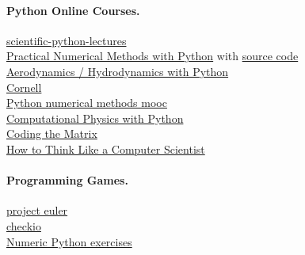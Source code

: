 \documentclass[%
oneside,                 %
final,                   %
10pt]{article}
\begin{document}
\paragraph{Python Online Courses.}
\href{{https://github.com/jrjohansson/scientific-python-lectures}}{scientific-python-lectures}  \\
\href{{http://openedx.seas.gwu.edu/courses/GW/MAE6286/2014_fall/about}}{Practical Numerical Methods with Python} with \href{{https://github.com/numerical-mooc/numerical-mooc}}{source code} \\
\href{{http://openedx.seas.gwu.edu/courses/GW/MAE6226/2014_spring/about}}{Aerodynamics / Hydrodynamics with Python} \\
\href{{http://pages.physics.cornell.edu/~sethna/StatMech/ComputerExercises/PythonSoftware/}}{Cornell}  \\
\href{{http://openedx.seas.gwu.edu/courses/GW/MAE6286/2014_fall/about}}{Python numerical methods mooc}  \\
\href{{http://www-personal.umich.edu/~mejn/computational-physics/}}{Computational Physics with Python} \\
\href{{http://cs.brown.edu/courses/cs053/current/index.htm}}{Coding the Matrix} \\
\href{{http://interactivepython.org/runestone/static/thinkcspy/index.html}}{How to Think Like a Computer Scientist} \\

\paragraph{Programming Games.}
\href{{https://projecteuler.net/}}{project euler} \\
\href{{https://checkio.org/}}{checkio} \\
\href{{https://github.com/rougier/numpy-100/blob/master/100%20Numpy%20exercises.md}}{Numeric Python exercises} \\




\vspace{3mm}




\vspace{3mm}






\printindex
\end{document}
